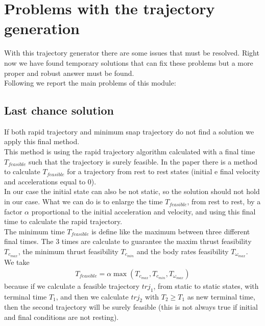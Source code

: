 \section{Problems with the trajectory generation} \label{sec:trajectory_problem}
With this trajectory generator there are some issues that must be resolved. Right now we have found temporary solutions that can fix these problems but a more proper and robust answer must be found.\\
Following we report the main problems of this module:

\subsection{Last chance solution}
If both rapid trajectory and minimum snap trajectory do not find a solution we apply this final method.\\

This method is using the rapid trajectory algorithm calculated with a final time $T_{feasible}$ such that the trajectory is surely feasible. In the paper \cite{mueller2015computationally} there is a method to calculate $T_{feasible}$ for a trajectory from rest to rest states (initial e final velocity and accelerations equal to 0).\\
In our case the initial state can also be not static, so the solution should not hold in our case. What we can do is to enlarge the time $T_{feasible}$, from rest to rest, by a factor $\alpha$ proportional to the initial acceleration and velocity, and using this final time to calculate the rapid trajectory.\\

The minimum time $T_{feasible}$ is define like the maximum between three different final times. The 3 times are calculate to guarantee the maxim thrust feasibility $T_{c_{max}}$, the minimum thrust feasibility $T_{c_{min}}$ and the body rates feasibility $T_{\omega_{max}}$. \\

We take 
\begin{align}
T_{feasible} = \alpha \max{(T_{c_{max}},T_{c_{min}},T_{\omega_{max}})}
\end{align}
because if  we calculate a feasible trajectory $trj_1$, from static to static states, with terminal time $T_1$, and then we calculate $trj_2$ with $T_2 \geq T_1$ as new terminal time, then the second trajectory will be surely feasible (this is not always true if initial and final conditions are not resting).\\

